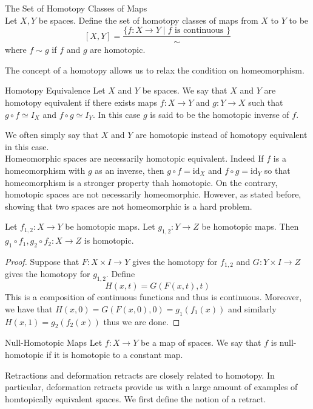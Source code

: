 \documentclass[a4paper]{article}
\begin{document}
\begin{defn}{The Set of Homotopy Classes of Maps}{}\\
Let $X,Y$ be spaces. Define the set of homotopy classes of maps from $X$ to $Y$ to be $$[X,Y]=\frac{\{f:X\to Y\;|\;f\text{ is continuous }\}}{\sim}$$ where $f\sim g$ if $f$ and $g$ are homotopic. 
\end{defn}

The concept of a homotopy allows us to relax the condition on homeomorphism. 

\begin{defn}{Homotopy Equivalence}{} Let $X$ and $Y$ be spaces. We say that $X$ and $Y$ are homotopy equivalent if there exists maps $f:X\to Y$ and $g:Y\to X$ such that $g\circ f\simeq I_X$ and $f\circ g\simeq I_Y$. In this case $g$ is said to be the homotopic inverse of $f$. 
\end{defn}

We often simply say that $X$ and $Y$ are homotopic instead of homotopy equivalent in this case. \\

Homeomorphic spaces are necessarily homotopic equivalent. Indeed If $f$ is a homeomorphism with $g$ as an inverse, then $g\circ f=\text{id}_X$ and $f\circ g=\text{id}_Y$ so that homeomorphism is a stronger property thah homotopic. On the contrary, homotopic spaces are not necessarily homeomorphic. However, as stated before, showing that two spaces are not homeomorphic is a hard problem. 

\begin{lmm}{}{} Let $f_{1,2}:X\to Y$ be homotopic maps. Let $g_{1,2}:Y\to Z$ be homotopic maps. Then $g_1\circ f_1,g_2\circ f_2:X\to Z$ is homotopic. 
\begin{proof}
Suppose that $F:X\times I\to Y$ gives the homotopy for $f_{1,2}$ and $G:Y\times I\to Z$ gives the homotopy for $g_{1,2}$. Define $$H(x,t)=G(F(x,t),t)$$ This is a composition of continuous functions and thus is continuous. Moreover, we have that $H(x,0)=G(F(x,0),0)=g_1(f_1(x))$ and similarly $H(x,1)=g_2(f_2(x))$ thus we are done. 
\end{proof}
\end{lmm}

\begin{defn}{Null-Homotopic Maps}{} Let $f:X\to Y$ be a map of spaces. We say that $f$ is null-homotopic if it is homotopic to a constant map. 
\end{defn}

Retractions and deformation retracts are closely related to homotopy. In particular, deformation retracts provide us with a large amount of examples of homtopically equivalent spaces. We first define the notion of a retract. 
\end{document}
